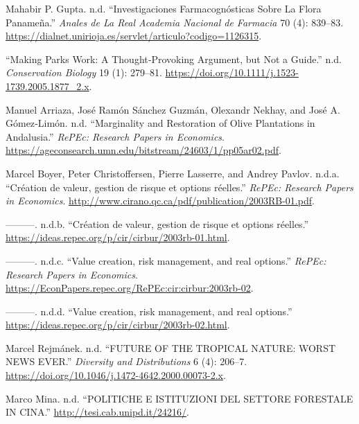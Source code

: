 \begin{CSLReferences}{1}{0}
Mahabir P. Gupta. n.d. {``Investigaciones Farmacognósticas Sobre La
Flora Panameña.''} \emph{Anales de La Real Academia Nacional de
Farmacia} 70 (4): 839--83.
\url{https://dialnet.unirioja.es/servlet/articulo?codigo=1126315}.

{``Making Parks Work: A Thought‐Provoking Argument, but Not a Guide.''}
n.d. \emph{Conservation Biology} 19 (1): 279--81.
\url{https://doi.org/10.1111/j.1523-1739.2005.1877_2.x}.

Manuel Arriaza, José Ramón Sánchez Guzmán, Olexandr Nekhay, and José A.
Gómez‐Limón. n.d. {``Marginality and Restoration of Olive Plantations in
Andalusia.''} \emph{RePEc: Research Papers in Economics}.
\url{https://ageconsearch.umn.edu/bitstream/24603/1/pp05ar02.pdf}.

Marcel Boyer, Peter Christoffersen, Pierre Lasserre, and Andrey Pavlov.
n.d.a. {``Création de valeur, gestion de risque et options réelles.''}
\emph{RePEc: Research Papers in Economics}.
\url{http://www.cirano.qc.ca/pdf/publication/2003RB-01.pdf}.

---------. n.d.b. {``Création de valeur, gestion de risque et options
réelles.''} \url{https://ideas.repec.org/p/cir/cirbur/2003rb-01.html}.

---------. n.d.c. {``Value creation, risk management, and real
options.''} \emph{RePEc: Research Papers in Economics}.
\url{https://EconPapers.repec.org/RePEc:cir:cirbur:2003rb-02}.

---------. n.d.d. {``Value creation, risk management, and real
options.''} \url{https://ideas.repec.org/p/cir/cirbur/2003rb-02.html}.

Marcel Rejmánek. n.d. {``FUTURE OF THE TROPICAL NATURE: WORST NEWS
EVER.''} \emph{Diversity and Distributions} 6 (4): 206--7.
\url{https://doi.org/10.1046/j.1472-4642.2000.00073-2.x}.

Marco Mina. n.d. {``POLITICHE E ISTITUZIONI DEL SETTORE FORESTALE IN
CINA.''} \url{http://tesi.cab.unipd.it/24216/}.


\end{CSLReferences}
